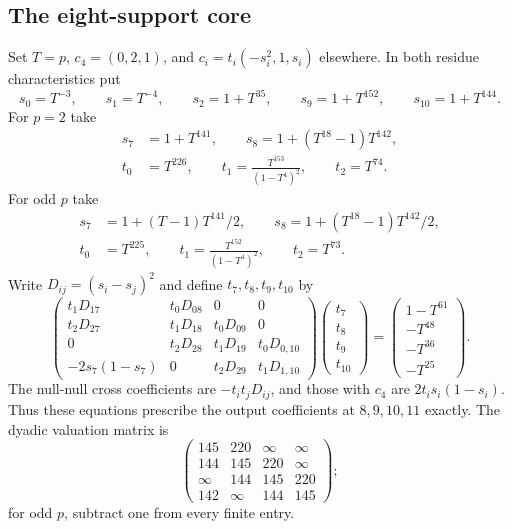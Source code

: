 \documentclass[11pt]{article}
\theoremstyle{remark}\newtheorem{remark}[theorem]{Remark}
\begin{document}
\subsection{The eight-support core}
Set $T=p$, $c_4=(0,2,1)$, and $c_i=t_i(-s_i^2,1,s_i)$ elsewhere.
In both residue characteristics put
\[
 s_0=T^{-3},\qquad s_1=T^{-4},\qquad s_2=1+T^{35},
 \qquad s_9=1+T^{152},\qquad s_{10}=1+T^{144}.
\]
For $p=2$ take
\[
\begin{split}
 s_7&=1+T^{141},\qquad s_8=1+(T^{18}-1)T^{142},\\
 t_0&=T^{226},\qquad t_1=\frac{T^{153}}{(1-T^4)^2},
 \qquad t_2=T^{74}.
\end{split}
\]
For odd $p$ take
\[
\begin{split}
 s_7&=1+(T-1)T^{141}/2,\qquad
 s_8=1+(T^{18}-1)T^{142}/2,\\
 t_0&=T^{225},\qquad t_1=\frac{T^{152}}{(1-T^4)^2},
 \qquad t_2=T^{73}.
\end{split}
\]
Write $D_{ij}=(s_i-s_j)^2$ and define $t_7,t_8,t_9,t_{10}$ by
\begin{equation}\label{eq:family-system}
\begin{pmatrix}
t_1D_{17}&t_0D_{08}&0&0\\
t_2D_{27}&t_1D_{18}&t_0D_{09}&0\\
0&t_2D_{28}&t_1D_{19}&t_0D_{0,10}\\
-2s_7(1-s_7)&0&t_2D_{29}&t_1D_{1,10}
\end{pmatrix}
\begin{pmatrix}t_7\\t_8\\t_9\\t_{10}\end{pmatrix}
=\begin{pmatrix}1-T^{61}\\-T^{48}\\-T^{36}\\-T^{25}\end{pmatrix}.
\end{equation}
The null-null cross coefficients are $-t_it_jD_{ij}$, and those with
$c_4$ are $2t_is_i(1-s_i)$. Thus these equations prescribe the output
coefficients at $8,9,10,11$ exactly.
The dyadic valuation matrix is
\[
\begin{pmatrix}
145&220&\infty&\infty\\
144&145&220&\infty\\
\infty&144&145&220\\
142&\infty&144&145
\end{pmatrix};
\]
for odd $p$, subtract one from every finite entry.
\end{document}
